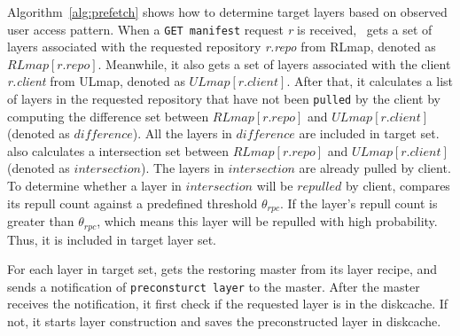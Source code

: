 Algorithm~\ref{alg:prefetch} shows how to determine target layers 
based on observed user access pattern.
When a \texttt{GET manifest} request \emph{r} is received,
\sysname~gets a set of layers associated with the requested repository \emph{r.repo} from RLmap, 
denoted as $RLmap[r.repo]$.
Meanwhile, it also gets a set of layers associated with the client \emph{r.client} from ULmap,
denoted as $ULmap[r.client]$.
After that, it calculates a list of layers in the requested repository 
that have not been \texttt{pulled} by the client by
computing the difference set between $RLmap[r.repo]$ and $ULmap[r.client]$ (denoted as $difference$).
All the layers in $difference$ are included in target set.
\sysname also calculates a intersection set between 
$RLmap[r.repo]$ and $ULmap[r.client]$ (denoted as $intersection$).
The layers in $intersection$ are already pulled by client.
To determine whether a layer in $intersection$ will be
$repulled$ by client,
\sysname compares its repull count against a predefined threshold $\theta_{rpc}$.
If the layer's repull count is greater than $\theta_{rpc}$,
which means this layer will be repulled with high probability.
Thus, it is included in target layer set.

For each layer in target set, 
\sysname gets the restoring master from its layer recipe,
and sends a notification of \texttt{preconsturct layer} to the master.
After the master receives the notification,
it first check if the requested layer is in the diskcache.
If not, 
it starts layer construction and saves the preconstructed layer in diskcache.
 
%


